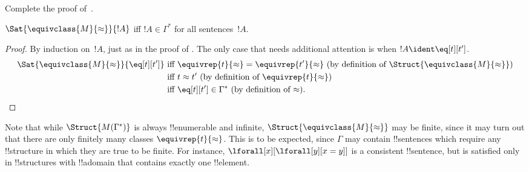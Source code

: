 \documentclass[../../../include/open-logic-section]{subfiles}
\begin{document}
\begin{prob}
Complete the proof of~.
\end{prob}

\begin{lem}
$\Sat{\equivclass{M}{\approx}}{!A}$ iff $!A \in \Gamma^*$ for all
  sentences~$!A$.
\end{lem}

\begin{proof}
By induction on~$!A$, just as in the proof of .
The only case that needs additional attention is when $!A \ident
\eq[t][t']$.
\begin{align*}
\Sat{\equivclass{M}{\approx}}{\eq[t][t']} & \text{ iff } \equivrep{t}{\approx} = \equivrep{t'}{\approx}
\text{ (by definition of $\Struct{\equivclass{M}{\approx}}$)}\\
& \text{ iff } t \approx t' \text{ (by definition of $\equivrep{t}{\approx}$)}\\
& \text{ iff } \eq[t][t'] \in \Gamma^* \text{ (by definition of $\approx$).}
\end{align*}
\end{proof}

\begin{digress}
Note that while $\Struct{M(\Gamma^*)}$ is always !!{enumerable} and
infinite, $\Struct{\equivclass{M}{\approx}}$ may be finite, since it
may turn out that there are only finitely many classes
$\equivrep{t}{\approx}$.  This is to be expected, since $\Gamma$ may
contain !!{sentence}s which require any !!{structure} in which they
are true to be finite.  For instance, $\lforall[x][\lforall[y][x =
y]]$ is a consistent !!{sentence}, but is satisfied only in
!!{structure}s with !!a{domain} that contains exactly one
!!{element}.
\end{digress}
\end{document}
